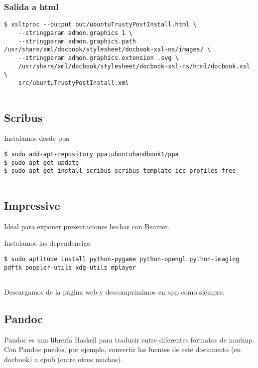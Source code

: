 \subsubsection{Salida a html}\label{salida-a-html}

\begin{verbatim}
$ xsltproc --output out/ubuntuTrustyPostInstall.html \
    --stringparam admon.graphics 1 \
    --stringparam admon.graphics.path /usr/share/xml/docbook/stylesheet/docbook-xsl-ns/images/ \
    --stringparam admon.graphics.extension .svg \
    /usr/share/xml/docbook/stylesheet/docbook-xsl-ns/html/docbook.xsl \
    src/ubuntuTrustyPostInstall.xml
        
\end{verbatim}

\subsection{Scribus}\label{scribus}

Instalamos desde ppa

\begin{verbatim}
$ sudo add-apt-repository ppa:ubuntuhandbook1/ppa
$ sudo apt-get update
$ sudo apt-get install scribus scribus-template icc-profiles-free
      
\end{verbatim}

\subsection{Impressive}\label{impressive}

Ideal para exponer presentaciones hechas con Beamer.

Instalamos las dependencias:

\begin{verbatim}
$ sudo aptitude install python-pygame python-opengl python-imaging pdftk poppler-utils xdg-utils mplayer
      
\end{verbatim}

Descargamos de la página web y descomprimimos en app como siempre.

\subsection{Pandoc}\label{pandoc}

Pandoc es una librería Haskell para traducir entre diferentes formatos
de markup. Con Pandoc puedes, por ejemplo, convertir los fuentes de este
documento (en docbook) a epub (entre otros muchos).

